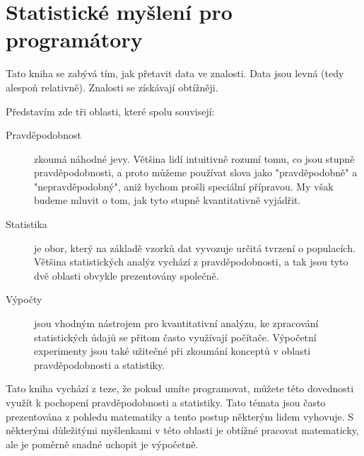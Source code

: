 \documentclass[12pt]{book}
\begin{document}
\normalsize

\clearemptydoublepage

\begin{latexonly}

\tableofcontents

\clearemptydoublepage

\end{latexonly}

\mainmatter


\chapter{Statistické myšlení pro programátory}
\label{intro}

Tato kniha se zabývá tím, jak přetavit data ve znalosti.  Data jsou levná (tedy alespoň relativně). Znalosti se získávají obtížněji.

Představím zde tři oblasti, které spolu souvisejí:

\begin{description}

\item[Pravděpodobnost] zkoumá náhodné jevy.  Většina lidí intuitivně rozumí tomu, co jsou stupně
  pravděpodobnosti, a proto můžeme používat slova jako "pravděpodobně" a "nepravděpodobný", aniž bychom prošli speciální přípravou. My však budeme mluvit o tom, jak tyto stupně kvantitativně vyjádřit.

\item[Statistika] je obor, který na základě vzorků dat vyvozuje určitá tvrzení o populacích.  Většina statistických analýz vychází z pravděpodobnosti, a tak jsou tyto dvě oblasti obvykle prezentovány společně.

\item[Výpočty] jsou vhodným nástrojem pro kvantitativní analýzu, ke zpracování statistických údajů se přitom často využívají počítače. Výpočetní experimenty jsou také užitečné při zkoumání konceptů v oblasti pravděpodobnosti a statistiky.

\end{description}

Tato kniha vychází z teze, že pokud umíte programovat, můžete této dovednosti využít k pochopení pravděpodobnosti a statistiky. Tato témata jsou často prezentována z pohledu matematiky a tento postup některým lidem vyhovuje. S některými důležitými myšlenkami v této oblasti je obtížné pracovat matematicky, ale je poměrně snadné uchopit je výpočetně.
\end{document}
